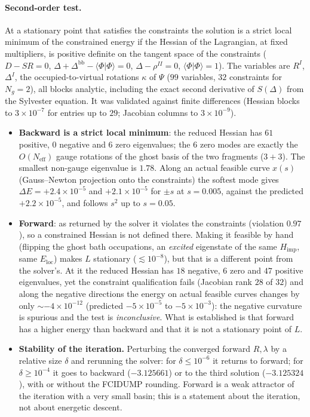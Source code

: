 \documentclass[11pt]{article}
\newcommand{\Neff}{N_{\mathrm{eff}}}
\newcommand{\Ng}{N_{g}}
\begin{document}
\paragraph{Second-order test.} At a stationary point that satisfies the constraints
the solution is a strict local minimum of the constrained energy if the Hessian of
the Lagrangian, at fixed multipliers, is positive definite on the tangent space of
the constraints
($D-SR=0$, $\Delta+\Delta^{\mathrm{bb}}-\langle\Phi|\Phi\rangle=0$, $\Delta-\rho^{II}=0$,
$\langle\Phi|\Phi\rangle=1$). The variables are $R^I$, $\Delta^I$, the occupied-to-virtual
rotations $\kappa$ of $\Psi$ ($99$ variables, $32$ constraints for $\Ng=2$), all
blocks analytic, including the exact second derivative of $S(\Delta)$ from the
Sylvester equation. It was validated against finite differences (Hessian blocks
to $3\times10^{-7}$ for entries up to $29$; Jacobian columns to $3\times10^{-9}$).
\begin{itemize}
  \item \textbf{Backward is a strict local minimum}: the reduced Hessian has $61$
    positive, $0$ negative and $6$ zero eigenvalues; the $6$ zero modes are exactly
    the $O(\Neff)$ gauge rotations of the ghost basis of the two fragments
    ($3+3$). The smallest non-gauge eigenvalue is $1.78$. Along an actual
    feasible curve $x(s)$ (Gauss--Newton projection onto the constraints) the softest
    mode gives $\Delta E=+2.4\times10^{-5}$ and $+2.1\times10^{-5}$ for $\pm s$ at
    $s=0.005$, against the predicted $+2.2\times10^{-5}$, and follows $s^{2}$ up to
    $s=0.05$.
  \item \textbf{Forward}: as returned by the solver it violates the constraints
    (violation $0.97$), so a constrained Hessian is not defined there. Making it
    feasible by hand (flipping the ghost bath occupations, an \emph{excited}
    eigenstate of the same $H_{\mathrm{imp}}$, same $E_{\mathrm{loc}}$) makes $L$ stationary
    ($\lesssim10^{-8}$), but that is a different point from the solver's. At it
    the reduced Hessian has $18$ negative, $6$ zero and $47$ positive
    eigenvalues, yet the constraint qualification fails (Jacobian rank $28$ of
    $32$) and along the negative directions the energy on actual feasible curves
    changes by only $\sim-4\times10^{-12}$ (predicted $-5\times10^{-5}$ to
    $-5\times10^{-3}$): the negative curvature is spurious and the test is
    \emph{inconclusive}. What is established is that forward has a higher energy than
    backward and that it is not a stationary point of $L$.
  \item \textbf{Stability of the iteration.} Perturbing the converged forward
    $R,\lambda$ by a relative size $\delta$ and rerunning the solver: for
    $\delta\le10^{-6}$ it returns to forward; for $\delta\ge10^{-4}$ it goes to
    backward ($-3.125661$) or to the third solution ($-3.125324$), with or without the
    FCIDUMP rounding. Forward is a weak attractor of the iteration with a very
    small basin; this is a statement about the iteration, not about energetic
    descent.
\end{itemize}
\end{document}
